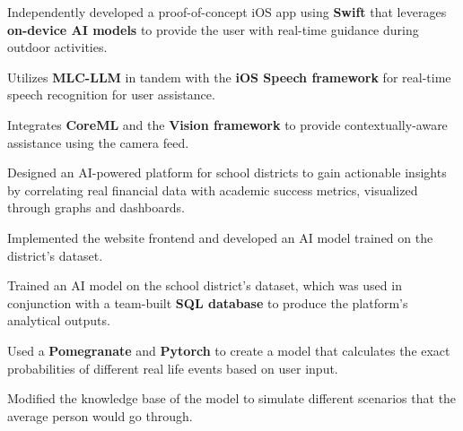 \documentclass[letterpaper,10pt]{article}
\begin{document}
  \vspace{0pt}
  \begin{resume_list}
    \vspace{1pt}
    \item Independently developed a proof-of-concept iOS app using \textbf{Swift} that leverages \textbf{on-device AI models} to provide the user with real-time guidance during outdoor activities.
    \vspace{1pt}
    \item Utilizes \textbf{MLC-LLM} in tandem with the \textbf{iOS Speech framework} for real-time speech recognition for user assistance.
    \vspace{1pt}
    \item Integrates \textbf{CoreML} and the \textbf{Vision framework} to provide contextually-aware assistance using the camera feed.
  \end{resume_list}

  \vspace{0pt}
  \begin{resume_list}
    \vspace{2pt}
    \item Designed an AI-powered platform for school districts to gain actionable insights by correlating real financial data with academic success metrics, visualized through graphs and dashboards.
    \vspace{1pt}
    \item Implemented the website frontend and developed an AI model trained on the district's dataset.
    \item Trained an AI model on the school district's dataset, which was used in conjunction with a team-built \textbf{SQL database} to produce the platform's analytical outputs.
  \end{resume_list}

  \vspace{0pt}
  \begin{resume_list}
    \vspace{2pt}
    \item Used a \textbf{Pomegranate} and \textbf{Pytorch} to create a model that calculates the exact probabilities of different real life events based on user input.
    \vspace{1pt}
    \item Modified the knowledge base of the model to simulate different scenarios that the average person would go through.
  \end{resume_list}
\end{document}
